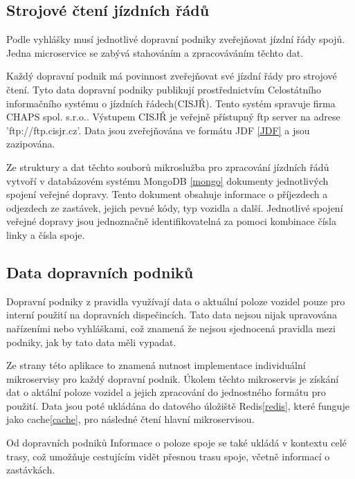 \subsection [Jízdní řády]{Strojové čtení jízdních řádů} \label{strojoveCteniJR}
Podle vyhlášky\cite{vyhlaskaJizdniRady} musí jednotlivé dopravní podniky zveřejňovat jízdní řády spojů. Jedna microservice se zabývá stahováním a zpracováváním těchto dat. \par
Každý dopravní podnik má povinnost zveřejňovat své jízdní řády pro strojové čtení. Tyto data dopravní podniky publikují prostřednictvím Celostátního informačního systému o jízdních řádech(CISJŘ)\cite{cisjr}. Tento systém spravuje firma CHAPS spol. s.r.o.\cite{chaps}. Výstupem CISJŘ je veřejně přístupný ftp server na adrese 'ftp://ftp.cisjr.cz'. Data jsou zveřejňována ve formátu JDF \ref{JDF} a jsou zazipována. \par
Ze struktury a dat těchto souborů mikroslužba pro zpracování jízdních řádů vytvoří v databázovém systému MongoDB \ref{mongo} dokumenty jednotlivých spojení veřejné dopravy. Tento dokument obsahuje informace o příjezdech a odjezdech ze zastávek, jejich pevné kódy, typ vozidla a další. Jednotlivé spojení veřejné dopravy jsou jednoznačně identifikovatelná za pomoci kombinace čísla linky a čísla spoje.
\subsection {Data dopravních podniků}
Dopravní podniky z pravidla využívají data o aktuální poloze vozidel pouze pro interní použití na dopravních dispečincích. Tato data nejsou nijak upravována nařízeními nebo vyhláškami, což znamená že nejsou sjednocená pravidla mezi podniky, jak by tato data měli vypadat.\par
Ze strany této aplikace to znamená nutnost implementace individuální mikroservisy pro každý dopravní podnik. Úkolem těchto mikroservis je získání dat o aktální poloze vozidel a jejich zpracování do jednostného formátu pro použití. Data jsou poté ukládána do datového úložiště Redis\ref{redis}, které funguje jako cache\ref{cache},  pro následné čtení hlavní mikroservisou.\par
Od dopravních podniků
Informace o poloze spoje se také ukládá v kontextu celé trasy, což umožňuje cestujícím vidět přesnou trasu spoje, včetně informací o zastávkách.


